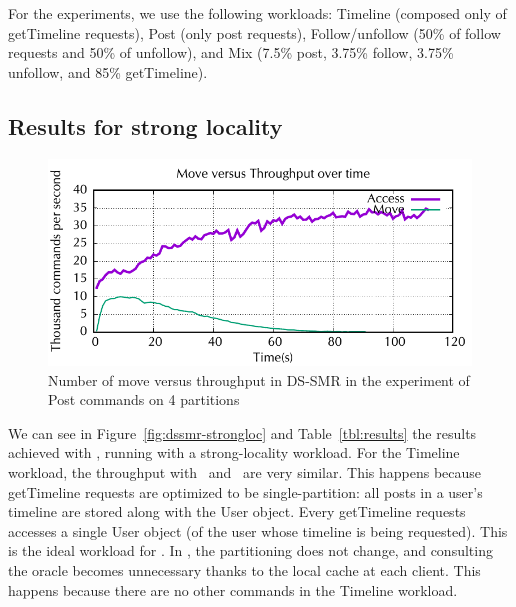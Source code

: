 For the experiments, we use the following workloads: Timeline (composed only of
getTimeline requests), Post (only post requests), Follow/unfollow (50\% of
follow requests and 50\% of unfollow), and Mix (7.5\% post, 3.75\% follow,
3.75\% unfollow, and 85\% getTimeline).

\subsection{Results for strong locality}
\label{sec:dssmr-evaluation:strongloc}


\begin{figure}[ht!]
\begin{minipage}[b]{1\linewidth}
\centering
      \includegraphics[width=0.6\linewidth]{figures/experiments/dssmr/move-vs-throughput}
\end{minipage}
\caption{Number of move versus throughput in DS-SMR in the experiment of Post commands on 4 partitions}
\label{fig:dssmr-move-vs-tp}
\end{figure}


We can see in Figure~\ref{fig:dssmr-strongloc} and Table~\ref{tbl:results} the
results achieved with \dssmrappname{}, running with a strong-locality workload.
For the Timeline workload, the throughput with \dssmr\ and \ssmr\ are very
similar. This happens because getTimeline requests are optimized to be
single-partition: all posts in a user's timeline are stored along with the User
object. Every getTimeline requests accesses a single User object (of the user
whose timeline is being requested). This is the ideal workload for \ssmr{}. In
\dssmr{}, the partitioning does not change, and consulting the oracle becomes
unnecessary thanks to the local cache at each client. This happens because there
are no other commands in the Timeline workload.

